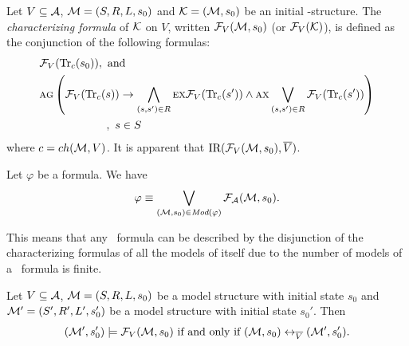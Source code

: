 \documentclass{article}
\begin{document}
Let $V\subseteq\cal A$, ${\cal M}=(S,R,L,s_0)$
and ${\cal K}=({\cal M},s_0)$ be an initial \MPK-structure.
The {\em characterizing formula} of $\cal K$ on $V$, written ${\cal F}_V({\cal M},s_0)$ (or ${\cal F}_V({\cal K})$), is
defined as the conjunction of the following formulas:
\begin{align*}
  &{\cal F}_V(\textrm{Tr}_c(s_0)), \mbox{ and }\\
  & \textsc{a} \textsc{g}\left(
    {\cal F}_V(\textrm{Tr}_c(s)) \rightarrow
    \bigwedge_{(s,s')\in R}
        \textsc{e} \textsc{x} {\cal F}_V(\textrm{Tr}_c(s'))
        \wedge
        \textsc{a} \textsc{x} \bigvee_{(s,s')\in R}{\cal F}_V(\textrm{Tr}_c(s'))
    \right) \\
  & \qquad  \qquad \qquad ,\ s\in S
\end{align*}
where $c=ch({\cal M},V)$. It is apparent that $\textrm{IR}({\cal F}_V({\cal M}, s_0), \overline V)$.


\begin{lemma}\label{lem:models:formula}
  Let $\varphi$ be a formula. We have
  \begin{equation}
    \varphi\equiv \bigvee_{({\cal M}, s_0)\in\textit{Mod}(\varphi)}{\cal F}_{\cal A}({\cal M}, s_0).
\end{equation}
\end{lemma}

This means that any \CTL\ formula can be described by the disjunction of the characterizing formulas of all the models of itself due to the number of models of a \CTL\ formula is finite.

\begin{theorem}\label{CF}
Let $V\subseteq {\cal A}$, ${\cal M}=(S,R,L,s_0)$ be a model structure with initial state $s_0$
and ${\cal M}'=(S',R', L',s_0')$ be a model structure with initial state $s_0'$.
Then  $$({\cal M}',s_0') \models {\cal F}_V({\cal M},s_0)
\mbox{ if and only if }
({\cal M},s_0) \leftrightarrow_{\overline V} ({\cal M}',s_0').$$
\end{theorem}
\end{document}
